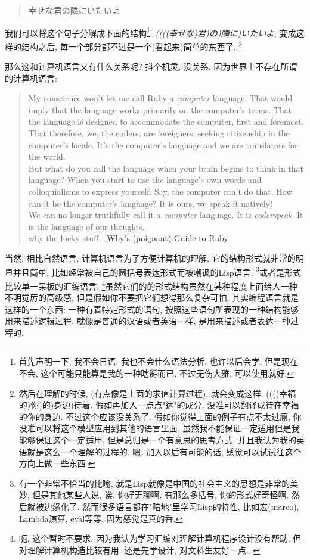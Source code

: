 \begin{quote}
  幸せな君の隣にいたいよ
\end{quote}

我们可以将这个句子分解成下面的结构\footnote{首先声明一下, 我不会日语, 我也不会什么语法分析, 也许以后会学, 但是现在不会, 这个可能只能算是我的一种瞎掰而已, 不过无伤大雅, 可以使用就好. }: \emph{((((幸せな)君)の)隣に)いたいよ}, 变成这样的结构之后, 每一个部分都不过是一个(看起来)简单的东西了. \footnote{然后在理解的时候, (有点像是上面的求值计算过程), 就会变成这样: ((((幸福的)你)的)身边)待着. 假如再加入一点点"达"的成分, 没准可以翻译成待在幸福的你的身边. 不过这个应该没关系了. 假如你觉得上面的例子有点不太过瘾, 你没准可以将这个模型应用到其他的语言里面, 虽然我不能保证一定适用但是我能够保证这个一定适用, 但是总归是一个有意思的思考方式. 并且我认为我的英语就是这么一个理解的过程的. 嗯, 加入以后有可能的话, 感觉可以试试往这个方向上做一些东西. }

那么这和计算机语言又有什么关系呢? 抖个机灵, 没关系, 因为世界上不存在所谓的计算机语言: 

\begin{quotation}
  My conscience won't let me call Ruby a \emph{computer} language. That would imply that the language works primarily on the computer's terms. That the language is designed to accommodate the computer, first and foremost. That therefore, we, the coders, are foreigners, seeking citizenship in the computer's locale. It's the computer's language and we are translators for the world. \\
  But what do you call the language when your brain begins to think in that language? When you start to use the language's own words and colloquialisms to express yourself. Say, the computer can't do that. How can it be the computer's language? It is ours, we speak it natively!\\
  We can no longer truthfully call it a \emph{computer} language. It is \emph{coderspeak}. It is the language of our thoughts.\\

  why the lucky stuff - \href{https://poignant.guide/book/chapter-3.html}{Why's (poignant) Guide to Ruby}
\end{quotation}

当然, 相比自然语言, 计算机语言为了方便计算机的理解, 它的结构形式就非常的明显并且简单, 比如经常被自己的圆括号表达形式而被嘲讽的Lisp语言, \footnote{有一个非常不恰当的比喻, 就是Lisp就像是中国的社会主义的思想是非常的美妙, 但是其他某些人说, 诶, 你好无聊啊, 有那么多括号, 你的形式好奇怪啊. 然后就被边缘化了. 然而很多语言都在"暗地"里学习Lisp的特性, 比如宏(marco), Lambda演算, eval等等. 因为感觉是真的香. }或者是形式比较单一呆板的汇编语言, \footnote{呃, 这个暂时不要求. 因为我认为学习汇编对理解计算机程序设计没有帮助. 但对理解计算机构造比较有用. 还是先学设计, 对文科生友好一点... }虽然它们的的形式结构虽然在某种程度上面给人一种不明觉厉的高级感, 但是假如你不要把它们想得那么复杂可怕, 其实编程语言就是这样的一个东西: 一种有着特定形式的语句, 按照这些语句所表现的一种结构能够用来描述逻辑过程. 就像是普通的汉语或者英语一样, 是用来描述或者表达一种过程的. 

